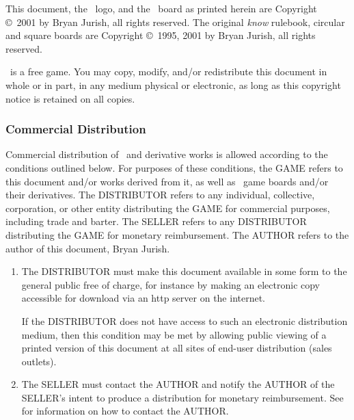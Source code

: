 %

This document, the \latex{\knowlatex}\html{\knowhtml}\ logo,
and the \know\ board as printed
herein are Copyright \copyright\ 2001 by Bryan Jurish,  all rights reserved.
The original {\sl know} rulebook, circular and square boards are
Copyright \copyright\ 1995, 2001 by Bryan Jurish, all rights reserved.

\know\ is a free game.  You may copy, modify, and/or redistribute
this document in whole or in part, in any medium physical or electronic,
as long as this copyright notice is retained on all copies.

\subsubsection{Commercial Distribution}\label{commercial}

Commercial distribution of \know\ and derivative works is allowed
according to the conditions outlined below.
For purposes of these conditions, the GAME refers to this document
and/or works derived from it, as well as \know\ game boards and/or their
derivatives.  The DISTRIBUTOR refers to any individual, collective, corporation,
or other entity distributing the GAME for commercial purposes,
including trade and barter.  The SELLER refers to any DISTRIBUTOR
distributing the GAME for monetary reimbursement.
The AUTHOR refers to the author of this document, Bryan Jurish.

\begin{enumerate}
  \item
    The DISTRIBUTOR must make this document available in some
    form to the general public free of charge,
    for instance by making an electronic copy accessible for
    download via an http server on the internet.

    If the DISTRIBUTOR does not have access to such an
    electronic distribution medium, then this condition may be
    met by allowing public viewing of a printed version of this
    document at all sites of end-user distribution (sales outlets).

  \item
    The SELLER must contact the AUTHOR and notify the
    AUTHOR of the SELLER's intent to produce a distribution
    for monetary reimbursement.  See  for information
    on how to contact the AUTHOR.
\end{enumerate}

%
